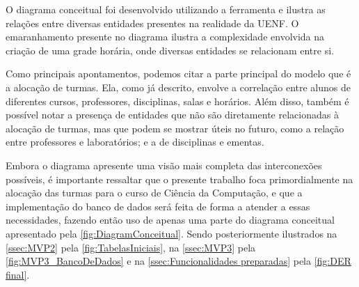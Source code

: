 O diagrama conceitual foi desenvolvido utilizando a ferramenta  e ilustra as relações entre diversas entidades presentes na realidade da UENF. O emaranhamento presente no diagrama ilustra a complexidade envolvida na criação de uma grade horária, onde diversas entidades se relacionam entre si.

Como principais apontamentos, podemos citar a parte principal do modelo que é a alocação de turmas. Ela, como já descrito, envolve a correlação entre alunos de diferentes cursos, professores, disciplinas, salas e horários. Além disso, também é possível notar a presença de entidades que não são diretamente relacionadas à alocação de turmas, mas que podem se mostrar úteis no futuro, como a relação entre professores e laboratórios; e a de disciplinas e ementas.

Embora o diagrama apresente uma visão mais completa das interconexões possíveis, é importante ressaltar que o presente trabalho foca primordialmente na alocação das turmas para o curso de Ciência da Computação, e que a implementação do banco de dados será feita de forma a atender a essas necessidades, fazendo então uso de apenas uma parte do diagrama conceitual apresentado pela \autoref{fig:DiagramConceitual}.
Sendo posteriormente ilustrados na \autoref{ssec:MVP2} pela \autoref{fig:TabelasIniciais}, na \autoref{ssec:MVP3} pela \autoref{fig:MVP3_BancoDeDados} e na \autoref{ssec:Funcionalidades preparadas} pela \autoref{fig:DER final}.





